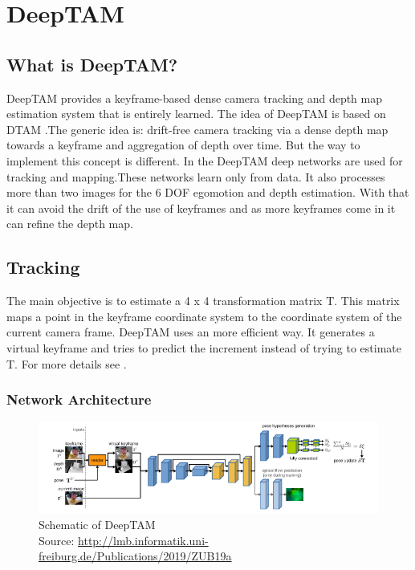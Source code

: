 \chapter{DeepTAM\authorB}

\section{What is DeepTAM?}
DeepTAM provides a keyframe-based dense camera tracking and depth map estimation system that is entirely learned. The idea of DeepTAM is based on DTAM \cite{dtam}.The generic idea is: drift-free camera tracking via a dense depth map towards a keyframe and aggregation of depth over time. But the way to implement this concept is different. In the DeepTAM deep networks are used for tracking and mapping.These networks learn only from data. It also processes more than two images for the 6 DOF egomotion and depth estimation. With that it can avoid the drift of the use of keyframes and as more keyframes come in it can refine the depth map.

\section{Tracking}
The main objective is to estimate a 4 x 4 transformation matrix T. This matrix maps a point in the keyframe coordinate system to the coordinate system of the current camera frame.
\newline
DeepTAM uses an more efficient way. It generates a virtual keyframe and tries to predict the increment instead of trying to estimate T. For more details see \cite{ZUB19a}. 

\subsection{Network Architecture}

\begin{figure}[h]
	\centering
	\includegraphics[width=1.1\textwidth]{./media/images/DeepTAM_schematic.PNG}
  	\caption{Schematic of DeepTAM
  	\\Source: \url{http://lmb.informatik.uni-freiburg.de/Publications/2019/ZUB19a}}
  	\label{DeepTAMschematic}
\end{figure}

